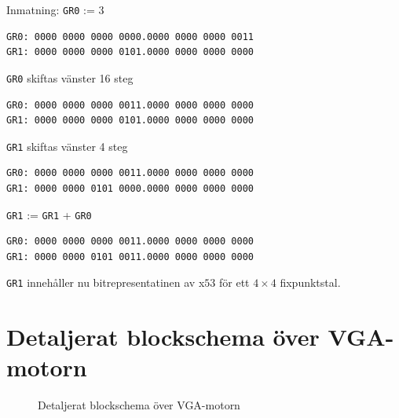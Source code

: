 \documentclass[]{article}
\begin{document}
\begin{appendices}
\newpage

\noindent
Inmatning: \texttt{GR0} := 3
\begin{framed}
\begin{verbatim}
GR0: 0000 0000 0000 0000.0000 0000 0000 0011
GR1: 0000 0000 0000 0101.0000 0000 0000 0000
\end{verbatim}
\end{framed}

\noindent
\texttt{GR0} skiftas vänster 16 steg
\begin{framed}
\begin{verbatim}
GR0: 0000 0000 0000 0011.0000 0000 0000 0000
GR1: 0000 0000 0000 0101.0000 0000 0000 0000
\end{verbatim}
\end{framed}

\noindent
\texttt{GR1} skiftas vänster 4 steg
\begin{framed}
\begin{verbatim}
GR0: 0000 0000 0000 0011.0000 0000 0000 0000
GR1: 0000 0000 0101 0000.0000 0000 0000 0000
\end{verbatim}
\end{framed}

\noindent
\texttt{GR1} := \texttt{GR1} + \texttt{GR0}
\begin{framed}
\begin{verbatim}
GR0: 0000 0000 0000 0011.0000 0000 0000 0000
GR1: 0000 0000 0101 0011.0000 0000 0000 0000
\end{verbatim}
\end{framed}

\noindent
\texttt{GR1} innehåller nu bitrepresentatinen av x$53$ för ett $4 \times 4$ fixpunktstal.

\newpage
\section{Detaljerat blockschema över VGA-motorn}
\label{figure:detailed_vga}
\begin{figure}[h!]
	\caption{Detaljerat blockschema över VGA-motorn}
\end{figure}
\end{appendices}
\end{document}
